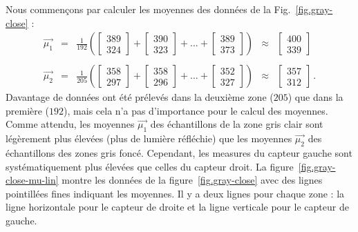Nous commençons par calculer les moyennes des données de la Fig.~\ref{fig.gray-close} :
\begin{displaymath}
\begin{array}{ccccc}
\vec{\mu_1} &=& {\displaystyle\frac{1}{192}} \left( \left[ \begin{array}{c} 389\\324 \end{array}\right] + \left[ \begin{array}{c} 390\\323 \end{array}\right] + ... + \left[ \begin{array}{c} 389\\373 \end{array}\right] \right)&\approx&\left[ \begin{array}{c} 400\\339 \end{array}\right]\\
\\
\vec{\mu_2} &=& {\displaystyle\frac{1}{205}} \left( \left[ \begin{array}{c} 358\\297 \end{array}\right] + \left[ \begin{array}{c} 358\\296 \end{array}\right] + ... + \left[ \begin{array}{c} 352\\327 \end{array}\right] \right)&\approx&\left[ \begin{array}{c} 357\\312 \end{array}\right]\,.
\end{array}
\end{displaymath}
Davantage de données ont été prélevés dans la deuxième zone ($205$) que dans la première ($192$), mais cela n'a pas d'importance pour le calcul des moyennes. Comme attendu, les moyennes $\vec{\mu_1}$ des échantillons de la zone gris clair sont légèrement plus élevées (plus de lumière réfléchie) que les moyennes $\vec{\mu_2}$ des échantillons des zones gris foncé. Cependant, les measures du capteur gauche sont systématiquement plus élevées que celles du capteur droit. La figure~\ref{fig.gray-close-mu-lin} montre les données de la figure~\ref{fig.gray-close} avec des lignes pointillées fines indiquant les moyennes. Il y a deux lignes pour chaque zone : la ligne horizontale pour le capteur de droite et la ligne verticale pour le capteur de gauche.

